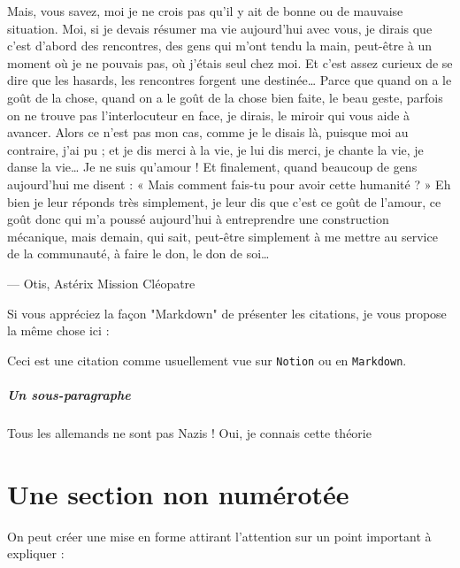 \begin{quoting}
    Mais, vous savez, moi je ne crois pas qu’il y ait de bonne ou de mauvaise situation. Moi, si je devais résumer ma vie aujourd’hui avec vous, je dirais que c’est d’abord des rencontres, des gens qui m’ont tendu la main, peut-être à un moment où je ne pouvais pas, où j’étais seul chez moi. Et c’est assez curieux de se dire que les hasards, les rencontres forgent une destinée… Parce que quand on a le goût de la chose, quand on a le goût de la chose bien faite, le beau geste, parfois on ne trouve pas l’interlocuteur en face, je dirais, le miroir qui vous aide à avancer. Alors ce n’est pas mon cas, comme je le disais là, puisque moi au contraire, j’ai pu ; et je dis merci à la vie, je lui dis merci, je chante la vie, je danse la vie… Je ne suis qu’amour ! Et finalement, quand beaucoup de gens aujourd’hui me disent : « Mais comment fais-tu pour avoir cette humanité ? » Eh bien je leur réponds très simplement, je leur dis que c’est ce goût de l’amour, ce goût donc qui m’a poussé aujourd’hui à entreprendre une construction mécanique, mais demain, qui sait, peut-être simplement à me mettre au service de la communauté, à faire le don, le don de soi…
    \begin{flushright}
        --- Otis, Astérix Mission Cléopatre
    \end{flushright}
\end{quoting}

Si vous appréciez la façon "Markdown" de présenter les citations, je vous propose la même chose ici :
\begin{quoted}
    Ceci est une citation comme usuellement vue sur \texttt{Notion} ou en \texttt{Markdown}.
\end{quoted}

\subparagraph{Un sous-paragraphe}

\begin{dialogue}
      Tous les allemands ne sont pas Nazis !
     Oui, je connais cette théorie
\end{dialogue}

\section*{Une section non numérotée}
On peut créer une mise en forme attirant l'attention sur un point important à expliquer :

